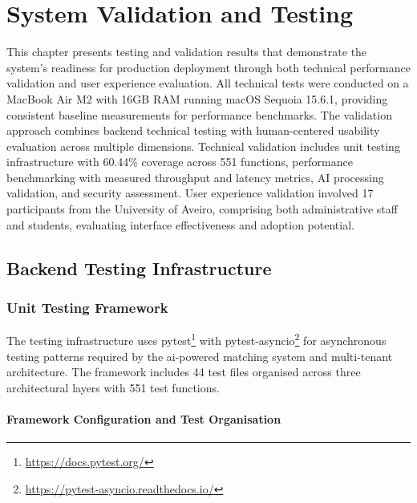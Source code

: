 \chapter{System Validation and Testing}
\label{chapter:testing_validation}

This chapter presents testing and validation results that demonstrate the system's readiness for production deployment through both technical performance validation and user experience evaluation. All technical tests were conducted on a MacBook Air M2 with 16GB RAM running macOS Sequoia 15.6.1, providing consistent baseline measurements for performance benchmarks. The validation approach combines backend technical testing with human-centered usability evaluation across multiple dimensions. Technical validation includes unit testing infrastructure with 60.44\% coverage across 551 functions, performance benchmarking with measured throughput and latency metrics, AI processing validation, and security assessment. User experience validation involved 17 participants from the University of Aveiro, comprising both administrative staff and students, evaluating interface effectiveness and adoption potential.


\section{Backend Testing Infrastructure} \label{section:backend_testing}

\subsection{Unit Testing Framework} \label{subsection:unit_testing_framework}

The testing infrastructure uses pytest\footnote{\url{https://docs.pytest.org/}} with pytest-asyncio\footnote{\url{https://pytest-asyncio.readthedocs.io/}} for asynchronous testing patterns required by the \ac{ai}-powered matching system and multi-tenant architecture. The framework includes 44 test files organised across three architectural layers with 551 test functions.

\subsubsection{Framework Configuration and Test Organisation}


